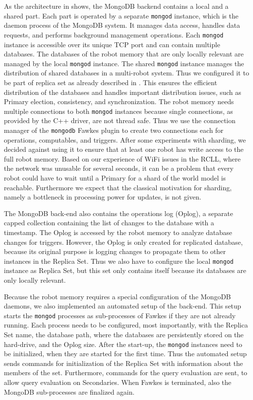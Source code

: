 As the architecture in  shows, the MongoDB backend
contains a local and a shared part. Each part is operated by a
separate \texttt{mongod} instance, which is the daemon process of the
MongoDB system. It manages data access, handles data requests, and
performs background management operations. Each \texttt{mongod}
instance is accessible over its unique TCP port and can contain multiple
databases. The databases of the robot memory that are only locally
relevant are managed by the local \texttt{mongod} instance. The shared
\texttt{mongod} instance manages the distribution of shared databases
in a multi-robot system. Thus we configured it to be part of replica
set as already described in . This ensures the
efficient distribution of the databases and handles important
distribution issues, such as Primary election, consistency, and
synchronization. The
robot memory needs multiple connections to both \texttt{mongod}
instances because single connections, as provided by the C++ driver,
are not thread safe. Thus we use the connection manager of the
\texttt{mongodb} Fawkes plugin to create two connections each for
operations, computables, and triggers. After some experiments with sharding, we decided
against using it to ensure that at least one robot has write access to
the full robot memory. Based on our experience of WiFi issues in the RCLL,
where the network was unusable for several seconds, it can be a
problem that every robot could have to wait until a Primary for a shard of
the world model is reachable.
Furthermore we expect that the classical motivation for sharding,
namely a bottleneck in processing power for updates, is not given.

The MongoDB back-end also contains the operations log (Oplog), a
separate capped collection containing the list of changes to the
database with a timestamp. The Oplog is accessed by the robot memory
to analyze database changes for triggers. However, the Oplog is only
created for replicated database, because its original purpose is
logging changes to propagate them to other instances in the Replica
Set. Thus we also have to configure the local \texttt{mongod} instance
as Replica Set, but this set only contains itself because its
databases are only locally relevant.

Because the robot memory requires a special configuration of the
MongoDB daemons, we also implemented an automated setup of the
back-end. This setup starts the \texttt{mongod} processes as
sub-processes of Fawkes if they are not already running. Each process
needs to be configured, most importantly, with the Replica Set name,
the database path, where the databases are persistently stored on the
hard-drive, and the Oplog size. After the start-up, the \texttt{mongod}
instances need to be initialized, when they are started for the first
time. Thus the automated setup sends commands for initialization of
the Replica Set with information about the members of the
set. Furthermore, commands for the query evaluation are sent, to allow
query evaluation on Secondaries. When Fawkes is terminated, also the
MongoDB sub-processes are finalized again.

